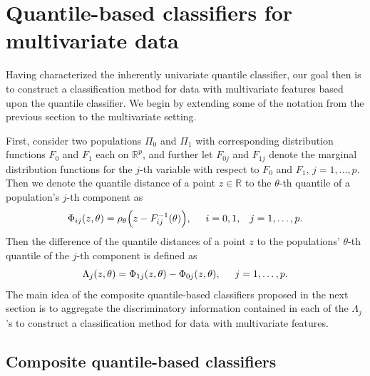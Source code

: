 
\section{Quantile-based classifiers for multivariate data}
\label{sec:multivariate-classifier}

Having characterized the inherently univariate quantile classifier, our goal
then is to construct a classification method for data with multivariate features
based upon the quantile classifier.  We begin by extending some of the notation
from the previous section to the multivariate setting.

First, consider two populations $\Pi_0$ and $\Pi_1$ with corresponding
distribution functions $F_0$ and $F_1$ each on $\mathbb{R}^{p}$, and further let
$F_{0j}$ and $F_{1j}$ denote the marginal distribution functions for the $j$-th
variable with respect to $F_0$ and $F_1$, $j = 1, \dots, p$.  Then we denote the
quantile distance of a point $z \in \mathbb{R}$ to the $\theta$-th quantile of a
population's $j$-th component as
\begin{equation}
  \label{eq:multivariate-phi}
  \Phi_{ij}(z, \theta) =
  \rho_{\theta}\Big(z - F_{ij}^{-1}(\theta) \Big),
  \hspace{5mm} i = 0, 1, \hspace{3mm} j = 1, \dots, p.
\end{equation}
Then the difference of the quantile distances of a point $z$ to the populations'
$\theta$-th quantile of the $j$-th component is defined as
\begin{equation}
  \Lambda_j (z, \theta) = \Phi_{1j}(z, \theta) - \Phi_{0j}(z, \theta),
  \hspace{5mm} j = 1, \dots, p.
\end{equation}
The main idea of the composite quantile-based classifiers proposed in the next
section is to aggregate the discriminatory information contained in each of the
$\Lambda_j$'s to construct a classification method for data with multivariate
features.


\subsection{Composite quantile-based classifiers}
\label{sec:varying-coefficient}

